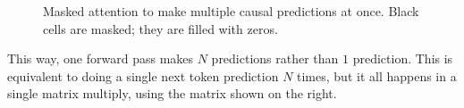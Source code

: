 \begin{figure}[h]
{\begin{minipage}{.49\linewidth}
\end{minipage}
}
\caption{Masked attention to make multiple causal predictions at once. Black cells are masked; they are filled with zeros.}
\end{figure}

This way, one forward pass makes $N$ predictions rather than $1$ prediction. This is equivalent to doing a single next token prediction $N$ times, but it all happens in a single matrix multiply, using the matrix shown on the right.

